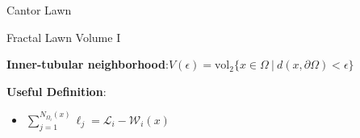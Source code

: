 \documentclass{if-beamer}
\newcommand{\SL}{\mathcal{L}}
\newcommand{\Om}{\Omega}
\newcommand{\W}{\mathcal{W}}
\begin{document}
\begin{frame}{Cantor Lawn}
	\begin{center}
	\end{center}
\end{frame}


\begin{frame}{Fractal Lawn Volume I}

{\bf Inner-tubular neighborhood}:\quad $V(\epsilon) = \text{vol}_2\{x \in \Om\ |\ d(x,\partial\Om) < \epsilon\}$
\pause
\vspace{0.2in}

{\bf Useful Definition}:
\begin{itemize}
	\item $\displaystyle \sum_{j = 1}^{N_{\Om_i}(x)}\ell_j=\SL_i - \W_i(x)$
\end{itemize}

\end{frame}
\end{document}
